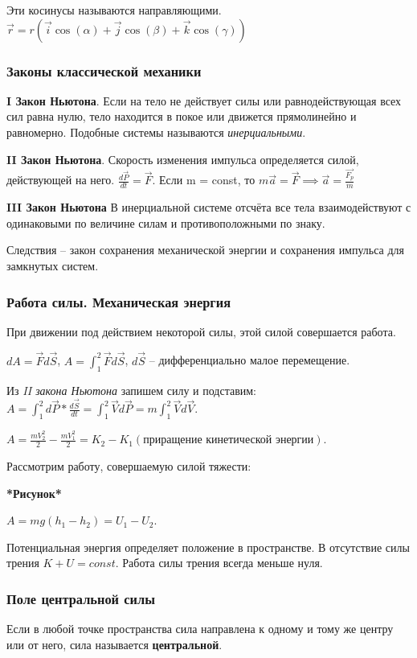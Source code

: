 \documentclass[a4paper,oneside]{article}
\theoremstyle{definition}
\theoremstyle{definition}
\theoremstyle{definition}
\newcommand{\tbf}[1]{\textbf{#1}}
\newcommand{\dsint}{\displaystyle\int}
\begin{document}
Эти косинусы называются направляющими. $\vec{r} = r (\vec{i}\cos(\alpha) + \vec{j}\cos(\beta) + \vec{k}\cos(\gamma))$

\subsubsection{Законы классической механики}

\tbf{I Закон Ньютона}. Если на тело не действует силы или равнодействующая всех сил равна нулю,
тело находится в покое или движется прямолинейно и равномерно. Подобные системы называются \textit{инерциальными}.

\tbf{II Закон Ньютона}. Скорость изменения импульса определяется силой, действующей на него. $\frac{d \vec{P}}{dt} = \vec{F}$.
Если m = const, то $m\vec{a}=\vec{F} \implies \vec{a}=\frac{\vec{F_p}}{m}$

\tbf{III Закон Ньютона} В инерциальной системе отсчёта все тела взаимодействуют с одинаковыми по величине силам
и противоположными по знаку.

Следствия -- закон сохранения механической энергии и сохранения импульса для замкнутых систем.


\subsubsection{Работа силы. Механическая энергия}
При движении под действием некоторой силы, этой силой совершается работа.

$dA = \vec{F} d \vec{S}$, $A = \dsint_1^2 \vec{F} d \vec{S}$, $d\vec{S}$ -- дифференциально малое перемещение. 

Из \textit{II закона Ньютона} запишем силу и подставим: 
$A = \dsint_1^2 d \vec{P} * \frac{d \vec{S}}{dt} = \dsint_1^2 \vec{V} d \vec{P} = m \dsint_1^2 \vec{V} d \vec{V}$.

$A = \frac{m V_2^2}{2} - \frac{m V_1^2}{2} = K_2 - K_1 (\text{приращение кинетической энергии})$.

Рассмотрим работу, совершаемую силой тяжести:

\tbf{*Рисунок*}

$A = mg(h_1 - h_2) = U_1 - U_2$.

Потенциальная энергия определяет положение в пространстве. В отсутствие силы трения $K + U = const$. 
Работа силы трения всегда меньше нуля.

\subsubsection{Поле центральной силы}
Если в любой точке пространства сила направлена к одному и тому же центру или от него,
сила называется \tbf{центральной}.
\end{document}
